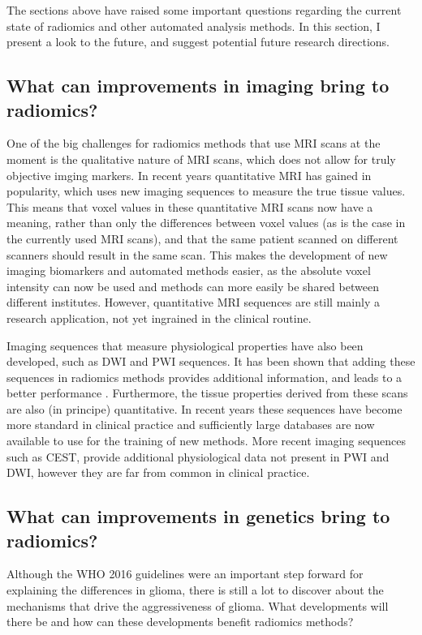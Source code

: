 The sections above have raised some important questions regarding the current state of radiomics and other automated analysis methods.
In this section, I present a look to the future, and suggest potential future research directions.


\subsection{What can improvements in imaging bring to radiomics?}\label{sec:dicussion_new_imaging}

One of the big challenges for radiomics methods that use \gls{MRI} scans at the moment is the qualitative nature of \gls{MRI} scans, which does not allow for truly objective imging markers.
In recent years quantitative \gls{MRI} has gained in popularity, which uses new imaging sequences to measure the true tissue values.
This means that voxel values in these quantitative \gls{MRI} scans now have a meaning, rather than only the differences between voxel values (as is the case in the currently used \gls{MRI} scans), and that the same patient scanned on different scanners should result in the same scan.
This makes the development of new imaging biomarkers and automated methods easier, as the absolute voxel intensity can now be used and methods can more easily be shared between different institutes.
However, quantitative \gls{MRI} sequences are still mainly a research application, not yet ingrained in the clinical routine.

Imaging sequences that measure physiological properties have also been developed, such as \gls{DWI} and \gls{PWI} sequences.
It has been shown that adding these sequences in radiomics methods provides additional information, and leads to a better performance \autocite{park2020radiomicsdwi,kim2020radiomicsdwi}.
Furthermore, the tissue properties derived from these scans are also (in principe) quantitative.
In recent years these sequences have become more standard in clinical practice and sufficiently large databases are now available to use for the training of new methods.
More recent imaging sequences such as \gls{CEST}, provide additional physiological data not present in \gls{PWI} and \gls{DWI}, however they are far from common in clinical practice.



\subsection{What can improvements in genetics bring to radiomics?}\label{sec:discussion_new_genetics}
Although the \gls{WHO} 2016 guidelines were an important step forward for explaining the differences in glioma, there is still a lot to discover about the mechanisms that drive the aggressiveness of glioma.
What developments will there be and how can these developments benefit radiomics methods?

